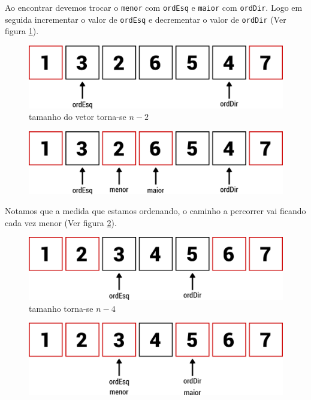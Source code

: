 Ao encontrar devemos trocar o \texttt{menor} com \texttt{ordEsq} e
\texttt{maior} com \texttt{ordDir}. Logo em seguida incrementar o valor
de \texttt{ordEsq} e decrementar o valor de \texttt{ordDir} (Ver figura
\ref{fig:passo3}).

\begin{figure}[h]
   \includegraphics[scale=0.6]{img/maior.menor.algoritmo/passo3.png}
   \caption{tamanho do vetor torna-se $n - 2$}
   \label{fig:passo3}
\end{figure}

\begin{figure}[h]
   \includegraphics[scale=0.6]{img/maior.menor.algoritmo/passo4.png}
\end{figure}

Notamos que a medida que estamos ordenando, o caminho a percorrer vai
ficando cada vez menor (Ver figura \ref{fig:passo5}).

\begin{figure}[h]
   \includegraphics[scale=0.6]{img/maior.menor.algoritmo/passo5.png}
   \caption{tamanho torna-se $n - 4$}
   \label{fig:passo5}
\end{figure}

\begin{figure}[h]
   \includegraphics[scale=0.6]{img/maior.menor.algoritmo/passo6.png}
\end{figure}

